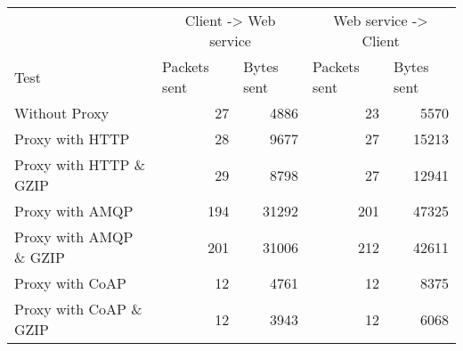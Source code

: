 \begin{tabular}{lrrrr}
\hline
\multicolumn{1}{l}{}                  & \multicolumn{2}{c}{Client -> Web service}                           & \multicolumn{2}{c}{Web service -> Client}                           \\
\multicolumn{1}{l}{Test} & \multicolumn{1}{l}{Packets sent} & \multicolumn{1}{l}{Bytes sent} & \multicolumn{1}{l}{Packets sent} & \multicolumn{1}{l}{Bytes sent} \\ \hline
Without Proxy                   & 27             & 4886           & 23             & 5570           \\
Proxy with HTTP                 & 28             & 9677           & 27             & 15213          \\
Proxy with HTTP \& GZIP         & 29             & 8798           & 27             & 12941          \\
Proxy with AMQP                 & 194            & 31292          & 201            & 47325          \\
Proxy with AMQP \& GZIP         & 201            & 31006          & 212            & 42611          \\
Proxy with CoAP                 & 12             & 4761           & 12             & 8375           \\
Proxy with CoAP \& GZIP         & 12             & 3943           & 12             & 6068           \\
\end{tabular}